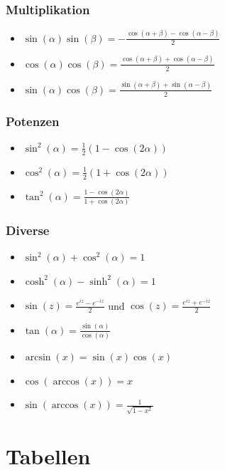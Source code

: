 \documentclass[8pt]{article}
\begin{document}
\begin{multicols*}{3}
\subsubsection{Multiplikation}
\begin{itemize}
 \item $\sin(\alpha) \sin(\beta) = -\frac{\cos(\alpha + \beta) - \cos(\alpha - \beta)}{2}$
 \item $\cos(\alpha) \cos(\beta) =  \frac{\cos(\alpha + \beta) + \cos(\alpha - \beta)}{2}$
 \item $\sin(\alpha) \cos(\beta) =  \frac{\sin(\alpha + \beta) + \sin(\alpha - \beta)}{2}$
\end{itemize}

\subsubsection{Potenzen}
\begin{itemize}
 \item $\sin^2(\alpha) = \frac{1}{2}(1-\cos(2\alpha))$
 \item $\cos^2(\alpha) = \frac{1}{2}(1+\cos(2\alpha))$
 \item $\tan^2(\alpha) = \frac{1-\cos(2\alpha)}{1+\cos(2\alpha)}$
\end{itemize}

\subsubsection{Diverse}

\begin{itemize}
 \item $\sin^2(\alpha) + \cos^2(\alpha) = 1$
 \item $\cosh^2(\alpha) - \sinh^2(\alpha) = 1$
 \item $\sin(z) = \frac{e^{iz} - e^{-iz}}{2}$ und $\cos(z) = \frac{e^{iz} + e^{-iz}}{2}$
 \item $\tan(\alpha) = \frac{\sin(\alpha)}{\cos(\alpha)}$
 \item $\arcsin(x) = \sin(x)\cos(x)$
 \item $\cos(\arccos(x)) = x$
 \item $\sin(\arccos(x)) = \frac{1}{\sqrt{1 - x^2}}$
\end{itemize}


\newpage

\section{Tabellen}

\end{multicols*}
\end{document}
